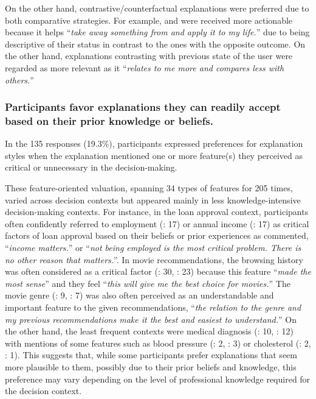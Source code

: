On the other hand, contrastive/counterfactual explanations were preferred due to both comparative strategies. For example, \cto and \cf were received more actionable because it helps ``\textit{take away something from and apply it to my life.}'' due to being descriptive of their status in contrast to  the ones with the opposite outcome. On the other hand, \ctt explanations contrasting with previous state of the user were regarded as more relevant as it ``\textit{relates to me more and compares less with others.}''


\subsubsection{Participants favor explanations they can readily accept based on their prior knowledge or beliefs.}
\label{sec:selective}
In the 135 responses (19.3\%), participants expressed preferences for explanation styles when the explanation mentioned one or more feature(s) they perceived as critical or unnecessary in the decision-making. 

These feature-oriented valuation, spanning 34 types of features for 205 times, varied across decision contexts but appeared mainly in less knowledge-intensive decision-making contexts. For instance, in the loan approval context, participants often confidently referred to employment (\loanN: 17) or annual income (\loanN: 17) as critical factors of loan approval based on their beliefs or prior experiences as commented, ``\textit{income matters.}'' or ``\textit{not being employed is the most critical problem. There is no other reason that matters.}''. In movie recommendations, the browsing history was often considered as a critical factor (\recomN: 30, \recomP: 23) because this feature ``\textit{made the most sense}'' and they feel ``\textit{this will give me the best choice for movies.}'' The movie genre (\recomN: 9, \recomP: 7) was also often perceived as an understandable and important feature to the given recommendations, ``\textit{the relation to the genre and my previous recommendations make it the best and easiest to understand.}'' On the other hand, the least frequent contexts were medical diagnosis (\mediN: 10, \mediP: 12) with mentions of some features such as blood pressure (\mediN: 2, \mediP: 3) or cholesterol (\mediN: 2, \mediP: 1). This suggests that, while some participants prefer explanations that seem more plausible to them, possibly due to their prior beliefs and knowledge, this preference may vary depending on the level of professional knowledge required for the decision context.


